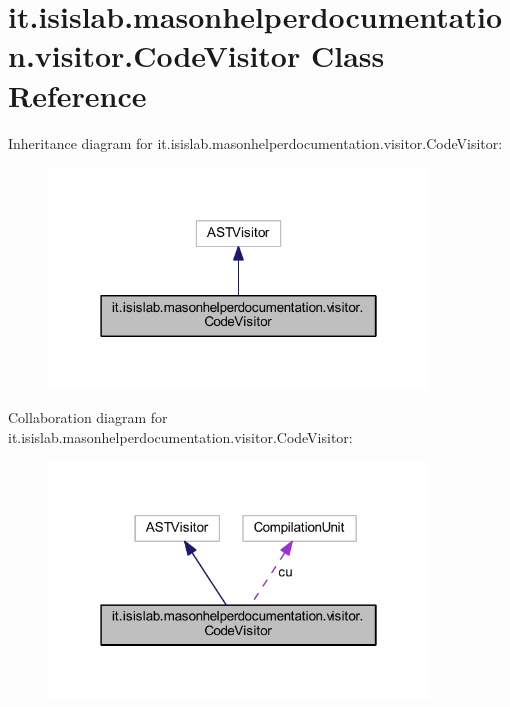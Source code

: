 \hypertarget{classit_1_1isislab_1_1masonhelperdocumentation_1_1visitor_1_1_code_visitor}{\section{it.\-isislab.\-masonhelperdocumentation.\-visitor.\-Code\-Visitor Class Reference}
\label{classit_1_1isislab_1_1masonhelperdocumentation_1_1visitor_1_1_code_visitor}
}


Inheritance diagram for it.\-isislab.\-masonhelperdocumentation.\-visitor.\-Code\-Visitor\-:\nopagebreak
\begin{figure}[H]
\begin{center}
\leavevmode
\includegraphics[width=286pt]{classit_1_1isislab_1_1masonhelperdocumentation_1_1visitor_1_1_code_visitor__inherit__graph}
\end{center}
\end{figure}


Collaboration diagram for it.\-isislab.\-masonhelperdocumentation.\-visitor.\-Code\-Visitor\-:\nopagebreak
\begin{figure}[H]
\begin{center}
\leavevmode
\includegraphics[width=286pt]{classit_1_1isislab_1_1masonhelperdocumentation_1_1visitor_1_1_code_visitor__coll__graph}
\end{center}
\end{figure}

